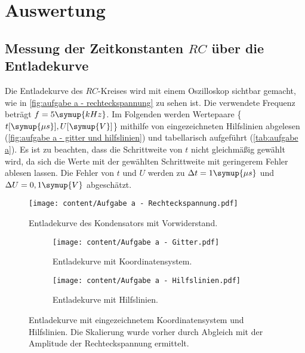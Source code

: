 \section{Auswertung}
\label{sec:Auswertung}
\subsection{Messung der Zeitkonstanten $RC$ über die Entladekurve}
Die Entladekurve des $RC$-Kreises wird mit einem Oszilloskop sichtbar gemacht, wie 
in \autoref{fig:aufgabe a - rechteckspannung} zu sehen ist. Die verwendete Frequenz beträgt $f=5\symup{kHz}$.
Im Folgenden werden Wertepaare \{$t [\symup{\mu s}], U [\symup{V}]$\} mithilfe von eingezeichneten Hilfslinien abgelesen
(\autoref{fig:aufgabe a - gitter und hilfslinien}) und tabellarisch aufgeführt (\autoref{tab:aufgabe a}). Es ist zu beachten,
dass die Schrittweite von $t$ nicht gleichmäßig gewählt wird, da sich die Werte mit der gewählten Schrittweite mit
geringerem Fehler ablesen lassen. Die Fehler von $t$ und $U$ werden zu
 $\Delta t = 1\symup{\mu s}$ und $\Delta U = 0,1\symup{V}$ abgeschätzt.

\begin{figure}
  \centering
  \texttt{[image: content/Aufgabe a - Rechteckspannung.pdf]}
  \caption{Entladekurve des Kondensators mit Vorwiderstand.}
  \label{fig:aufgabe a - rechteckspannung}
\end{figure}

\begin{figure}
  \begin{subfigure}{0.48\textwidth}
    \centering
    \texttt{[image: content/Aufgabe a - Gitter.pdf]}
    \caption{Entladekurve mit Koordinatensystem.}
    \label{fig:aufgabe a - gitter}
  \end{subfigure}
  \hfill
  \begin{subfigure}{0.48\textwidth}
    \centering
    \texttt{[image: content/Aufgabe a - Hilfslinien.pdf]}
    \caption{Entladekurve mit Hilfslinien.}
    \label{fig:aufgabe a - hilfslinien}
  \end{subfigure}
  \caption{Entladekurve mit eingezeichnetem Koordinatensystem und Hilfslinien. Die %
    Skalierung wurde vorher durch Abgleich mit der Amplitude der Rechteckspannung ermittelt.}
  \label{fig:aufgabe a - gitter und hilfslinien}
\end{figure}

